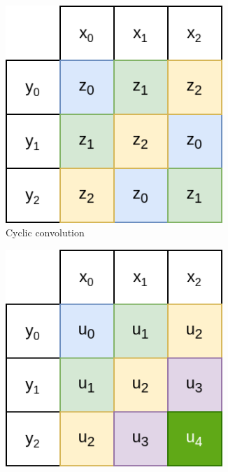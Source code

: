 \begin{figure}
		\centering
		\begin{subfigure}{.33\textwidth}
				\centering
				\includegraphics[width=0.9\textwidth]{../resources/cyclic_convolution.drawio.png}
				\caption{Cyclic convolution}
				\label{fig:cyclic_convolution}
		\end{subfigure}%
		\begin{subfigure}{.33\textwidth}
				\centering
				\includegraphics[width=0.9\textwidth]{../resources/acyclic_convolution.drawio.png}

\end{subfigure}
\end{figure}
